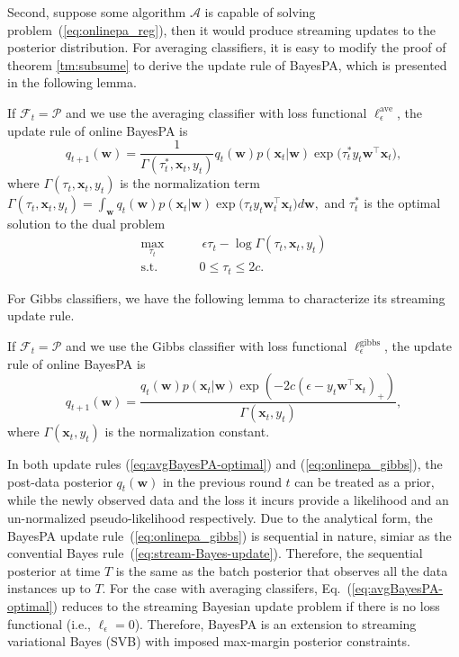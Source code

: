 \documentclass[twoside,11pt]{article}
\newcommand{\xv}{\bm{x}}
\newcommand{\algo}{\mathcal{A}}
\newcommand{\wv}{\bm{w}}
\newcommand{\prob}{\mathcal{P}}
\begin{document}
%
Second, suppose some algorithm $\algo$ is capable of solving problem~(\ref{eq:onlinepa_reg}), then it would produce streaming updates to the posterior distribution. For averaging classifiers, it is easy to modify the proof of theorem \ref{tm:subsume} to derive the update rule of BayesPA, which is presented in the following lemma.
%
\begin{lemma}\label{lemma:avgBayesPA-Rep}
If $\mathcal{F}_t=\prob$ and we use the averaging classifier with loss functional $\ell_\epsilon^\text{ave}$, the update rule of online BayesPA is
%
\begin{equation}\label{eq:avgBayesPA-optimal}
q_{t+1}(\wv) = \frac{1}{\Gamma(\tau_t^*, \xv_t, y_t)} q_t(\wv) p(\xv_t | \wv) \exp\Big(\tau_t^* y_t \wv^\top \xv_t \Big),
\end{equation}
where $\Gamma(\tau_t, \xv_t, y_t)$ is the normalization term
$%
\Gamma(\tau_t, \xv_t, y_t) = \int_{\wv}{q_t(\wv) p(\xv_t | \wv) \exp \Big(\tau_t y_t \wv_t^\top \xv_t \Big)d\wv},
$ %
and $\tau_t^*$ is the optimal solution to the dual problem
\textnormal{\begin{equation} \nonumber
\begin{array}{rl}
\max\limits_{\tau_t} & ~~~~~~~~~ {~\epsilon\tau_t-\log \Gamma(\tau_t, \xv_t, y_t)} \\
\text{s.t. } & ~~~~~~~~~ 0 \leq \tau_t \leq 2 c .
\end{array}
\end{equation}}
\end{lemma}
For Gibbs classifiers, we have the following lemma to characterize its streaming update rule.
\begin{lemma} \label{lm:pagibbs}
If $\mathcal{F}_t=\prob$ and we use the Gibbs classifier with loss functional  $\ell_\epsilon^{\text{gibbs}}$, the update rule of online BayesPA is
%
\begin{equation}\label{eq:onlinepa_gibbs}
q_{t+1}(\wv) = \frac{q_{t}(\wv) p(\xv_t | \wv) \exp\left( - 2 c \left( \epsilon-y_t \wv^\top \xv_t \right)_+ \right) }{\Gamma(\xv_t, y_t)},
\end{equation}
%
where $\Gamma(\xv_t, y_t)$ is the normalization constant.
\end{lemma}
In both update rules (\ref{eq:avgBayesPA-optimal}) and (\ref{eq:onlinepa_gibbs}), the post-data posterior $q_t(\bm{w})$ in the previous round $t$ can be treated as a prior, while the newly observed data and the loss it incurs provide a likelihood and an un-normalized pseudo-likelihood respectively. Due to the analytical form, the BayesPA update rule~(\ref{eq:onlinepa_gibbs}) is sequential in nature, simiar as the convential Bayes rule~(\ref{eq:stream-Bayes-update}). Therefore, the sequential posterior at time $T$ is the same as the batch posterior that observes all the data instances up to $T$.
For the case with averaging classifers, Eq.~(\ref{eq:avgBayesPA-optimal}) reduces to the streaming Bayesian update problem if there is no loss functional (i.e., $\ell_\epsilon = 0$). Therefore, BayesPA is an extension to streaming variational Bayes (SVB) with imposed max-margin posterior constraints.
\end{document}

